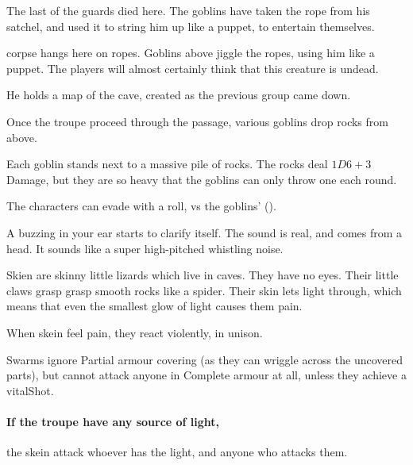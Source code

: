 \begin{multicols}{2}

\begin{exampletext}
  The last of the \glspl{guard} died here.
  The goblins have taken the rope from his satchel, and used it to string him up like a puppet, to entertain themselves.
\end{exampletext}

 corpse hangs here on ropes.
Goblins above jiggle the ropes, using him like a puppet.
The players will almost certainly think that this creature is undead.

He holds a map of the cave, created as the previous group came down.

Once the troupe proceed through the passage, various goblins drop rocks from above.


Each goblin stands next to a massive pile of rocks.
The rocks deal $1D6+3$ Damage, but they are so heavy that the goblins can only throw one each round.

The characters can evade with a  roll, vs the goblins'  (\tn).

\begin{boxtext}
  A buzzing in your ear starts to clarify itself.
  The sound is real, and comes from a head.
  It sounds like a super high-pitched whistling noise.
\end{boxtext}


Skien are skinny little lizards which live in caves.
They have no eyes.
Their little claws grasp grasp smooth rocks like a spider.
Their skin lets light through, which means that even the smallest glow of light causes them pain.

When skein feel pain, they react violently, in unison.

\skeinSwarm

Swarms ignore Partial armour covering (as they can wriggle across the uncovered parts), but cannot attack anyone in Complete armour at all, unless they achieve a \gls{vitalShot}.%

\paragraph{If the troupe have any source of light,}
the skein attack whoever has the light, and anyone who attacks them.


\end{multicols}

